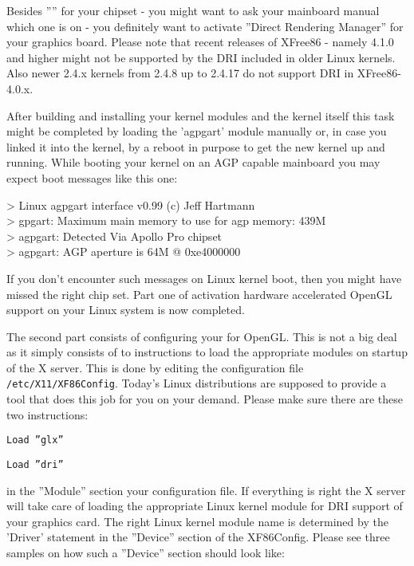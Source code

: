 Besides '''' for your chipset - you might want to ask your
mainboard manual which one is on - you definitely want to activate ''Direct
Rendering Manager'' for your graphics board. Please note that recent releases
of XFree86 - namely 4.1.0 and higher might not be supported by the DRI
included in older Linux kernels. Also newer 2.4.x kernels from 2.4.8 up to
2.4.17 do not support DRI in XFree86-4.0.x.

After building and installing your kernel modules and the kernel itself this
task might be completed by loading the 'agpgart' module manually or, in case
you linked it into the kernel, by a reboot in purpose to get the new kernel
up and running. While booting your kernel on an AGP capable mainboard you
may expect boot messages like this one:
\medskip

\begin{ttfamily}
\noindent
> Linux agpgart interface v0.99 (c) Jeff Hartmann\\
> gpgart: Maximum main memory to use for agp memory: 439M\\
> agpgart: Detected Via Apollo Pro chipset\\
> agpgart: AGP aperture is 64M @ 0xe4000000
\end{ttfamily}
\medskip

If you don't encounter such messages on Linux kernel boot, then you might
have missed the right chip set. Part one of activation hardware accelerated OpenGL support on your Linux system is now completed.

The second part consists of configuring your  for OpenGL. This is
not a big deal as it simply consists of to instructions to load the
appropriate modules on startup of the X server.
This is done by editing the configuration file \texttt{/etc/X11/XF86Config}. Today's
Linux distributions are supposed to provide a tool that does this job for
you on your demand. Please make sure there are these two instructions:
\medskip


 \texttt{Load ''glx''}
 
 \texttt{Load ''dri''}
\medskip

\noindent
in the ''Module'' section your  configuration file. If everything is
right the X server will take care of loading the appropriate Linux kernel
module for DRI support of your graphics card. The right Linux kernel module
name is determined by the 'Driver' statement in the ''Device'' section of the
XF86Config. Please see three samples on how such a ''Device'' section should
look like:
\medskip

